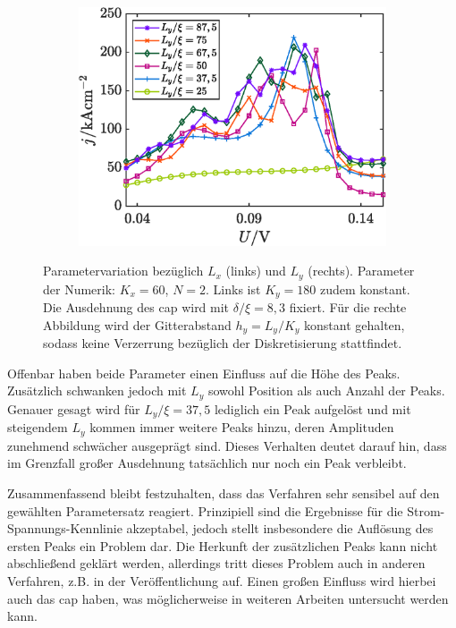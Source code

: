 \begin{figure}
\begin{subfigure}[b]{0.48\textwidth}
        \includegraphics[width=\textwidth]{plots/IV/IV_Ly_variation.eps}
        \label{fig:iv3_2}
    \end{subfigure}
    \caption[]
    {Parametervariation bezüglich $L_x$ (links) und $L_y$ (rechts). Parameter der Numerik: $K_x=60$, $N=2$. Links ist  $K_y=180$ zudem konstant. Die Ausdehnung des \ac{cap} wird mit $\delta/\xi=8,3$ fixiert. Für die rechte Abbildung wird der Gitterabstand $h_y=L_y/K_y$ konstant gehalten, sodass keine Verzerrung bezüglich der Diskretisierung stattfindet.}
    \label{fig:iv3}
\end{figure}
Offenbar haben beide Parameter einen Einfluss auf die Höhe des Peaks. Zusätzlich schwanken jedoch mit $L_y$ sowohl Position als auch Anzahl der Peaks. Genauer gesagt wird für $L_y/\xi=37,5$ lediglich ein Peak aufgelöst und mit steigendem $L_y$ kommen immer weitere Peaks hinzu, deren Amplituden zunehmend schwächer ausgeprägt sind. Dieses Verhalten deutet darauf hin, dass im Grenzfall großer Ausdehnung tatsächlich nur noch ein Peak verbleibt.

Zusammenfassend bleibt festzuhalten, dass das Verfahren sehr sensibel auf den gewählten Parametersatz reagiert. Prinzipiell sind die Ergebnisse für die Strom-Spannungs-Kennlinie akzeptabel, jedoch stellt insbesondere die Auflösung des ersten Peaks ein  Problem dar. Die Herkunft der zusätzlichen Peaks kann nicht abschließend geklärt werden, allerdings tritt dieses Problem auch in anderen Verfahren, z.B. in der Veröffentlichung \cite{jiang2011accuracy} auf. Einen großen Einfluss wird hierbei auch das \ac{cap} haben, was möglicherweise in weiteren Arbeiten untersucht werden kann.

